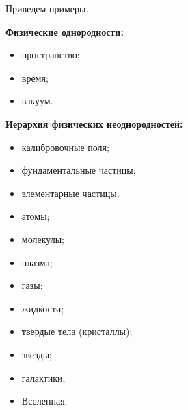 Приведем примеры.





\smallskip





\textbf{Физические однородности:}


\begin{itemize}


\item пространство;\\[-14pt]


\item время;\\[-14pt]


\item вакуум.


\end{itemize}





\textbf{Иерархия физических неоднородностей:}


\begin{itemize}


\item калибровочные поля;\\[-14pt]


\item фундаментальные частицы;\\[-14pt]


\item элементарные частицы;\\[-14pt]


\item атомы;\\[-14pt]


\item молекулы;\\[-14pt]


\item плазма;\\[-14pt]


\item газы;\\[-14pt]


\item жидкости;\\[-14pt]


\item твердые тела (кристаллы);\\[-14pt]


\item звезды;\\[-14pt]


\item галактики;\\[-14pt]


\item Вселенная.


\end{itemize}





